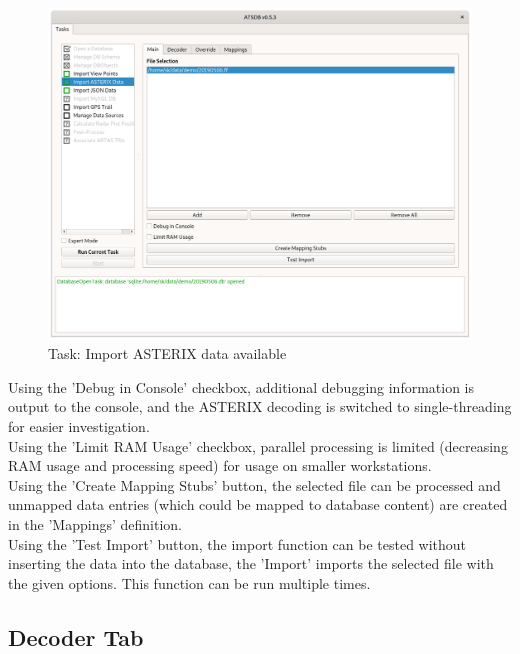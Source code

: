 \begin{figure}[H]
  \hspace*{-2.5cm}
    \includegraphics[width=19cm]{../screenshots/asterix_import_data_ready.png}
  \caption{Task: Import ASTERIX data available}
\end{figure}

Using the 'Debug in Console' checkbox, additional debugging information is output to the console, and the ASTERIX decoding is switched to single-threading for easier investigation. \\

Using the 'Limit RAM Usage' checkbox, parallel processing is limited (decreasing RAM usage and processing speed) for usage on smaller workstations. \\

Using the 'Create Mapping Stubs' button, the selected file can be processed and unmapped data entries (which could be mapped to database content) are created in the 'Mappings' definition. \\

Using the 'Test Import' button, the import function can be tested without inserting the data into the 
database, the 'Import' imports the selected file with the given options. This function can be run multiple times. \\

\subsection{Decoder Tab}

